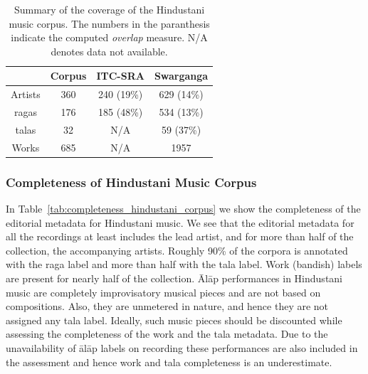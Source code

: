 \begin{table}
	\begin{centering}
		\begin{tabular}{ c c c c}
			\hline
			& Corpus	& ITC-SRA			& Swarganga\\
			\hline
			Artists			& 	360		& 	240 (19\%)	& 	629 (14\%)\\						
			\Glspl{raga}	& 	176		& 	185 (48\%)	& 	534 (13\%)\\
			\Glspl{tala}	& 	32		& 	N/A			& 	59 (37\%)\\
			Works			& 	685		& 	N/A			& 	1957\\

			\hline
			
		\end{tabular}
		\par \end{centering}	
	\caption[Coverage of the Hindustani music corpus]{Summary of the coverage of the Hindustani music corpus. The numbers in the paranthesis indicate the computed \textit{overlap} measure. N/A denotes data not available.} 
	\label{tab:coverage_summary_hindustani_corpus}
\end{table}


\subsubsection{Completeness of Hindustani Music Corpus}
\label{sec:corpus_completeness_of_hindustani_music_corpus}

In Table~\ref{tab:completeness_hindustani_corpus} we show the completeness of the editorial metadata for Hindustani music. We see that the editorial metadata for all the recordings at least includes the lead artist, and for more than half of the collection, the accompanying artists. Roughly 90\% of the corpora is annotated with the \gls{raga} label and more than half with the \gls{tala} label. Work (bandish) labels are present for nearly half of the collection. \={A}l\={a}p performances in Hindustani music are completely improvisatory musical pieces and are not based on compositions. Also, they are unmetered in nature, and hence they are not assigned any \gls{tala} label. Ideally, such music pieces should be discounted while assessing the completeness of the work  and the \gls{tala} metadata. Due to the unavailability of \={a}l\={a}p labels on recording these performances are also included in the assessment and hence work and \gls{tala} completeness is an underestimate.



